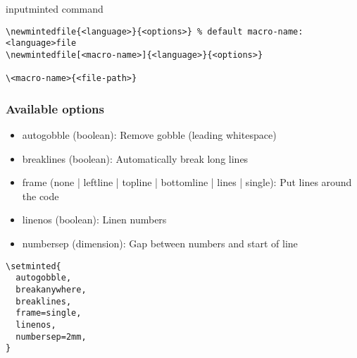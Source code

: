 \documentclass[../../latex]{subfiles}
\begin{document}
inputminted command

\begin{verbatim}
\newmintedfile{<language>}{<options>} % default macro-name: <language>file
\newmintedfile[<macro-name>]{<language>}{<options>}

\<macro-name>{<file-path>}
\end{verbatim}

\subsubsection{Available options}

\begin{itemize}
  \item autogobble (boolean): Remove gobble (leading whitespace)
  \item breaklines (boolean): Automatically break long lines
  \item frame (none | leftline | topline | bottomline | lines | single): Put lines around the code
  \item linenos (boolean): Linen numbers
  \item numbersep (dimension): Gap between numbers and start of line
\end{itemize}

\begin{verbatim}
\setminted{
  autogobble,
  breakanywhere,
  breaklines,
  frame=single,
  linenos,
  numbersep=2mm,
}
\end{verbatim}
\end{document}

